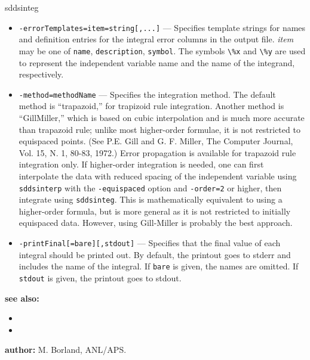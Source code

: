 \begin{sddsprog}{sddsinteg}
\begin{itemize}
      \item \verb|-errorTemplates=item=string[,...]| --- Specifies template strings for names and definition entries for the integral error columns in the output file. {\em item} may be one of \verb|name|, \verb|description|, \verb|symbol|. The symbols \verb|\%x| and \verb|\%y| are used to represent the independent variable name and the name of the integrand, respectively.
      \item \verb|-method=methodName| --- Specifies the integration method. The default method is ``trapazoid,'' for trapizoid rule integration. Another method is ``GillMiller,'' which is based on cubic interpolation and is much more accurate than trapazoid rule; unlike most higher-order formulae, it is not restricted to equispaced points. (See P.E. Gill and G. F. Miller, The Computer Journal, Vol. 15, N. 1, 80-83, 1972.) Error propagation is available for trapazoid rule integration only. If higher-order integration is needed, one can first interpolate the data with reduced spacing of the independent variable using \verb|sddsinterp| with the \verb|-equispaced| option and \verb|-order=2| or higher, then integrate using \verb|sddsinteg|. This is mathematically equivalent to using a higher-order formula, but is more general as it is not restricted to initially equispaced data. However, using Gill-Miller is probably the best approach.
      \item \verb|-printFinal[=bare][,stdout]| --- Specifies that the final value of each integral should be printed out. By default, the printout goes to stderr and includes the name of the integral. If \verb|bare| is given, the names are omitted. If \verb|stdout| is given, the printout goes to stdout.
    \end{itemize}
  \item {\bf see also:}
    \begin{itemize}
      \item {}
      \item {}
    \end{itemize}
  \item {\bf author:} M. Borland, ANL/APS.
\end{sddsprog}

